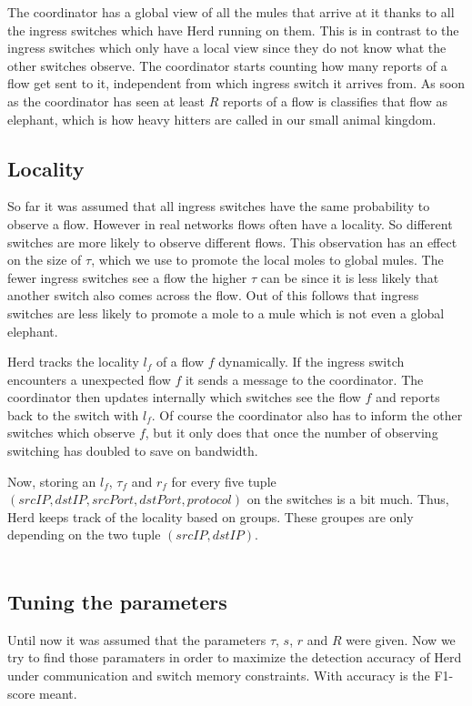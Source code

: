 \documentclass[11pt,oneside,a4paper]{article}
\begin{document}
The coordinator has a global view of all the mules that arrive at it thanks to all the ingress switches which have Herd running on them. This is in contrast to the ingress switches which only have a local view since they do not know what the other switches observe. The coordinator starts counting how many reports of a flow get sent to it, independent from which ingress switch it arrives from. As soon as the coordinator has seen at least $R$ reports of a flow is classifies that flow as elephant, which is how heavy hitters are called in our small animal kingdom.

\subsection{Locality} \label{locality}
So far it was assumed that all ingress switches have the same probability to observe a flow. However in real networks flows often have a locality. So different switches are more likely to observe different flows. This observation has an effect on the size of $\tau$, which we use to promote the local moles to global mules. The fewer ingress switches see a flow the higher $\tau$ can be since it is less likely that another switch also comes across the flow. Out of this follows that ingress switches are less likely to promote a mole to a mule which is not even a global elephant.

Herd tracks the locality $l_f$ of a flow $f$ dynamically. If the ingress switch encounters a unexpected flow $f$ it sends a message to the coordinator. The coordinator then updates internally which switches see the flow $f$ and reports back to the switch with $l_f$. Of course the coordinator also has to inform the other switches which observe $f$, but it only does that once the number of observing switching has doubled to save on bandwidth.

Now, storing an $l_f$, $\tau_f$ and $r_f$ for every five tuple $(srcIP, dstIP, srcPort, dstPort, protocol)$ on the switches is a bit much. Thus, Herd keeps track of the locality based on groups. These groupes are only depending on the two tuple $(srcIP, dstIP)$.\\\\

\subsection{Tuning the parameters} \label{tuningparameters}
Until now it was assumed that the parameters $\tau$, $s$, $r$ and $R$ were given. Now we try to find those paramaters in order to maximize the detection accuracy of Herd under communication and switch memory constraints. With accuracy is the F1-score meant. 
\end{document}
